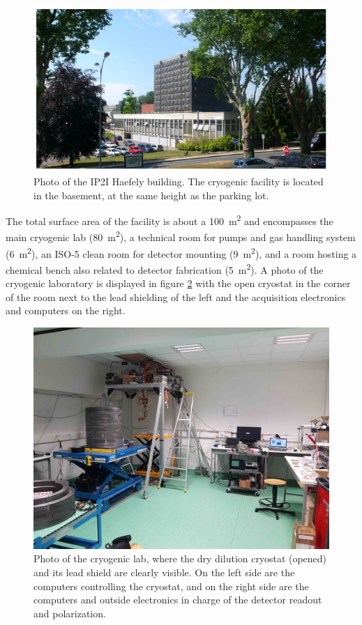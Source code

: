 \begin{figure}
\centering
\includegraphics[width=\textwidth,angle=0]{Figures/Experiment/haefely_building.png}
\caption{Photo of the IP2I Haefely building. The cryogenic facility is located in the basement, at the same height as the parking lot.}
\label{fig:haefely-building}
\end{figure}

The total surface area of the facility is about a \SI{100}{\m^2} and encompasses the main cryogenic lab (\SI{80}{\m^2}), a technical room for pumps and gas handling system (\SI{6}{\m^2}), an ISO-5 clean room for detector mounting (\SI{9}{\m^2}), and a room hosting a chemical bench also related to detector fabrication (\SI{5}{\m^2}). A photo of the cryogenic laboratory is displayed in figure \ref{fig:cryolab} with the open cryostat in the corner of the room next to the lead shielding of the left and the acquisition electronics and computers on the right.

\begin{figure}
\begin{center}
\includegraphics[width=\textwidth,angle=0]{Figures/Experiment/ip2i_cryogenic_facility.jpg}
\caption{Photo of the cryogenic lab, where the dry dilution cryostat (opened) and its lead shield are clearly visible. On the left side are the computers controlling the cryostat, and on the right side are the computers and outside electronics in charge of the detector readout and polarization.}
\label{fig:cryolab}
\end{center}
\end{figure}

